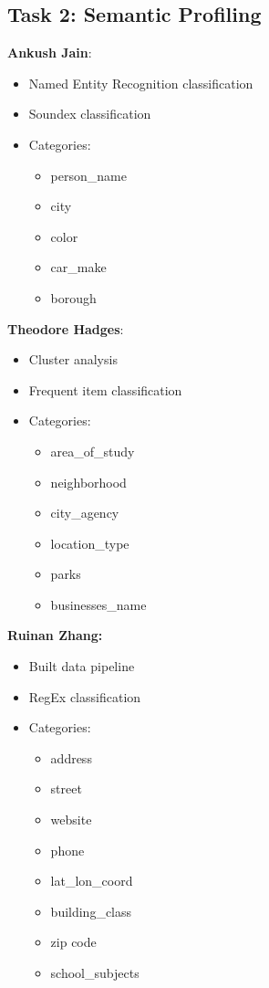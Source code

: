 \documentclass[sigconf,authordraft]{acmart}
\begin{document}
\subsection{Task 2: Semantic Profiling}
\textbf{Ankush Jain}: 
\begin{itemize}
    \item Named Entity Recognition classification
    \item Soundex classification
    \item Categories:
    \begin{itemize}
        \item person\_name
        \item city
        \item color
        \item car\_make
        \item borough
    \end{itemize}
\end{itemize}
\textbf{Theodore Hadges}: 
\begin{itemize}
    \item Cluster analysis
    \item Frequent item classification
    \item Categories:
    \begin{itemize}
        \item area\_of\_study
        \item neighborhood
        \item city\_agency
        \item location\_type
        \item parks
        \item businesses\_name
    \end{itemize}
\end{itemize}
\textbf{Ruinan Zhang:}
\begin{itemize}
    \item Built data pipeline
    \item RegEx classification
    \item Categories:
    \begin{itemize}
        \item address
        \item street
        \item website
        \item phone
        \item lat\_lon\_coord
        \item building\_class
        \item zip code
        \item school\_subjects
    \end{itemize}
\end{itemize}
\end{document}

